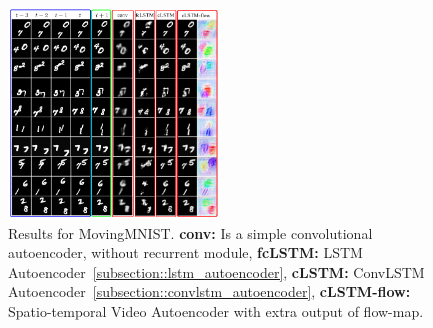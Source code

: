   \begin{figure}[H]
   \includegraphics[width=0.5\textwidth]{../Images/patraucean_results_mnist.png}
   \centering
   \caption{Results for MovingMNIST. \textbf{conv:} Is a simple convolutional autoencoder, without recurrent module, \textbf{fcLSTM:} LSTM Autoencoder~\ref{subsection::lstm_autoencoder},
   \textbf{cLSTM:} ConvLSTM Autoencoder~\ref{subsection::convlstm_autoencoder}, \textbf{cLSTM-flow:} Spatio-temporal Video Autoencoder with extra output of flow-map. \cite{Patraucean2015}}
   \label{fig:spatiotemp_results}
  \end{figure}
 
